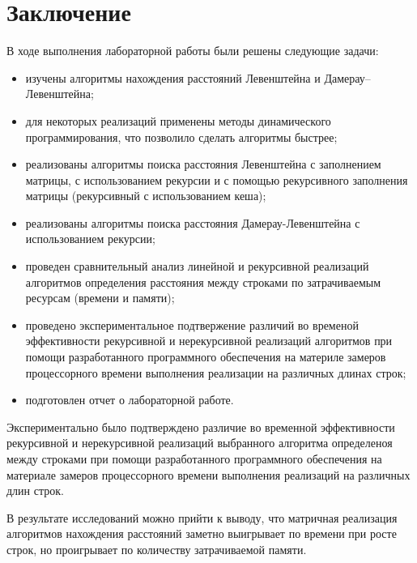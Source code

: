 \chapter*{Заключение}

В ходе выполнения лабораторной работы были решены следующие задачи:

\begin{itemize}
    \item изучены алгоритмы нахождения расстояний Левенштейна и Дамерау--Левенштейна;
	\item для некоторых реализаций применены методы динамического программирования, что позволило сделать алгоритмы быстрее;
	\item реализованы алгоритмы поиска расстояния Левенштейна с заполнением матрицы, с использованием рекурсии и с помощью рекурсивного заполнения матрицы (рекурсивный с использованием кеша);
	\item реализованы алгоритмы поиска расстояния Дамерау-Левенштейна с использованием рекурсии;
	\item проведен сравнительный анализ линейной и рекурсивной реализаций алгоритмов определения расстояния между строками по затрачиваемым ресурсам (времени и памяти);
	\item проведено экспериментальное подтвержение различий во временой эффективности рекурсивной и нерекурсивной реализаций алгоритмов при помощи разработанного программного обеспечения на материле замеров процессорного времени выполнения реализации на различных длинах строк;
	\item подготовлен отчет о лабораторной работе.
\end{itemize}

Экспериментально было подтверждено различие во временной эффективности рекурсивной и нерекурсивной реализаций выбранного алгоритма определеноя между строками при помощи разработанного программного обеспечения на материале замеров процессорного времени выполнения реализаций на различных длин строк.

В результате исследований можно прийти к выводу, что матричная реализация алгоритмов нахождения расстояний заметно выигрывает по времени при росте строк, но проигрывает по количеству затрачиваемой памяти.
